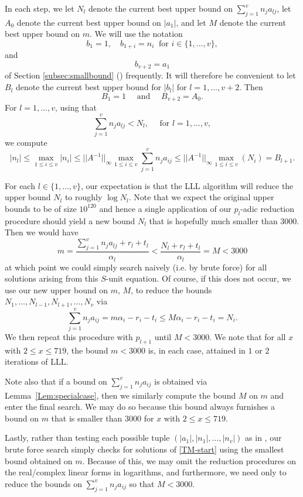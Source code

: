 In each step, we let $N_l$ denote the current best upper bound on $\sum_{j = 1}^v n_ja_{lj}$, let $A_0$ denote the current best upper bound on $|a_1|$, and let $M$ denote the current best upper bound on $m$. We will use the notation 
\[b_1 = 1, \quad b_{1+i} = n_i \ \text{ for } i \in \{1, \dots, v\},\]
and
\[ b_{v+2} = a_1\]
of Section \ref{subsec:smallbound} () frequently. It will therefore be convenient to let $B_l$ denote the current best upper bound for $|b_l|$ for $l = 1, \dots, v+2$. Then
\[B_1 = 1 \quad \text{ and } \quad B_{v+2} = A_0.\]
For $l = 1, \dots, v$, using that
\[ \sum_{j = 1}^v n_ja_{lj} < N_l, \quad \text{ for } l = 1, \dots, v,\]
we compute
\[|n_l| \leq \max_{1 \leq i \leq v}|n_i| \leq ||A^{-1}||_{\infty}\max_{1 \leq i\leq v}\sum_{j = 1}^v n_j a_{ij}
\leq ||A^{-1}||_{\infty} \max_{1 \leq i\leq v}(N_i) = B_{l+1}.\]

For each $l \in \{1, \dots, v\}$, our expectation is that the LLL algorithm will reduce the upper bound $N_l$ to roughly $\log{N_l}$. Note that we expect the original upper bounds to be of size $10^{120}$ and hence a single application of our $p_l$-adic reduction procedure should yield a new bound $N_l$ that is hopefully much smaller than $3000$. Then we would have
$$
m = \frac{\sum_{j = 1}^{v}n_ja_{lj} + r_l + t_l}{\alpha_l} < \frac{N_l+ r_l + t_l}{\alpha_l} = M < 3000
$$
at which point we could simply search naively (i.e. by brute force)  for all solutions arising from this $S$-unit equation. Of course, if this does not occur, we use our new upper bound on $m$, $M$, to reduce the bounds $N_1, \dots, N_{l-1}, N_{l+1}, \dots, N_v$ via
\[\sum_{j=1}^v n_ja_{ij} = m\alpha_i - r_i - t_i \leq M\alpha_i - r_i - t_i = N_i.\]
We then repeat this procedure with $p_{l+1}$ until $M < 3000$. We note that for all $x$ with $2 \leq x \leq 719$, the bound $m < 3000$ is, in each case, attained in $1$ or $2$ iterations of LLL.

Note also that if a bound on $\sum_{j = 1}^v n_ja_{ij}$ is obtained via Lemma~\ref{Lem:specialcase}, then we similarly compute the bound $M$ on $m$ and enter the final search. We may do so because this bound always furnishes a bound on $m$ that is smaller than $3000$ for $x$ with $2 \leq x \leq 719$. 

Lastly, rather than testing each possible tuple $(|a_1|,|n_1|, \dots, |n_v|)$ as in \cite{TW3}, our brute force search simply checks for solutions of \eqref{TM-start} using the smallest bound obtained on $m$. Because of this, we may omit the reduction procedures on the real/complex linear forms in logarithms, and furthermore, we need only to reduce the bounds on $\sum_{j = 1}^v n_ja_{ij}$ so that $M < 3000$. 

